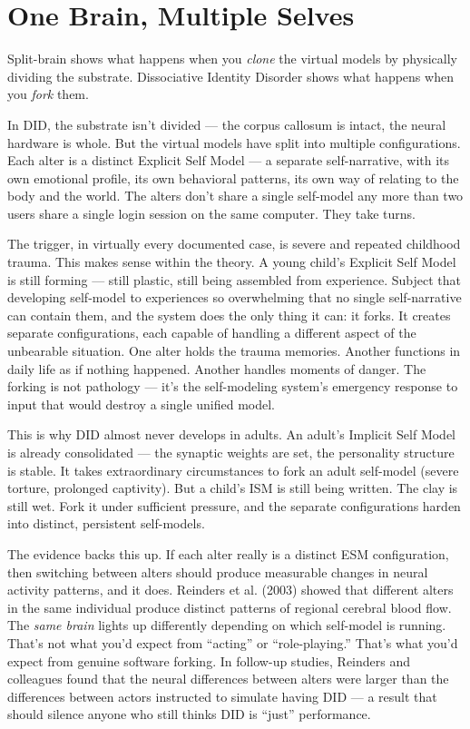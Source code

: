 \documentclass[11pt, twoside, openright]{book}
\begin{document}
\section*{One Brain, Multiple Selves}

Split-brain shows what happens when you \textit{clone} the virtual models by physically dividing the substrate. Dissociative Identity Disorder shows what happens when you \textit{fork} them.

In DID, the substrate isn't divided --- the corpus callosum is intact, the neural hardware is whole. But the virtual models have split into multiple configurations. Each alter is a distinct Explicit Self Model --- a separate self-narrative, with its own emotional profile, its own behavioral patterns, its own way of relating to the body and the world. The alters don't share a single self-model any more than two users share a single login session on the same computer. They take turns.

The trigger, in virtually every documented case, is severe and repeated childhood trauma. This makes sense within the theory. A young child's Explicit Self Model is still forming --- still plastic, still being assembled from experience. Subject that developing self-model to experiences so overwhelming that no single self-narrative can contain them, and the system does the only thing it can: it forks. It creates separate configurations, each capable of handling a different aspect of the unbearable situation. One alter holds the trauma memories. Another functions in daily life as if nothing happened. Another handles moments of danger. The forking is not pathology --- it's the self-modeling system's emergency response to input that would destroy a single unified model.

This is why DID almost never develops in adults. An adult's Implicit Self Model is already consolidated --- the synaptic weights are set, the personality structure is stable. It takes extraordinary circumstances to fork an adult self-model (severe torture, prolonged captivity). But a child's ISM is still being written. The clay is still wet. Fork it under sufficient pressure, and the separate configurations harden into distinct, persistent self-models.

The evidence backs this up. If each alter really is a distinct ESM configuration, then switching between alters should produce measurable changes in neural activity patterns, and it does. Reinders et al. (2003) showed that different alters in the same individual produce distinct patterns of regional cerebral blood flow. The \textit{same brain} lights up differently depending on which self-model is running. That's not what you'd expect from ``acting'' or ``role-playing.'' That's what you'd expect from genuine software forking. In follow-up studies, Reinders and colleagues found that the neural differences between alters were larger than the differences between actors instructed to simulate having DID --- a result that should silence anyone who still thinks DID is ``just'' performance.
\end{document}
